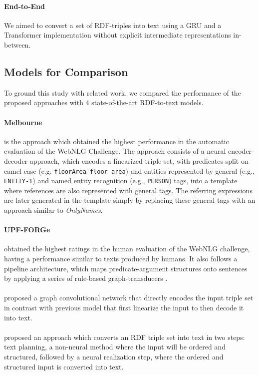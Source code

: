 \documentclass[11pt,a4paper]{article}
\begin{document}
\paragraph{End-to-End} We aimed to convert a set of RDF-triples into text using a GRU and a Transformer implementation without explicit intermediate representations in-between.

\subsection{Models for Comparison}

To ground this study with related work, we compared the performance of the proposed approaches with 4 state-of-the-art RDF-to-text models.

\paragraph{Melbourne} is the approach which obtained the highest performance in the automatic evaluation of the WebNLG Challenge. The approach consists of a neural encoder-decoder approach, which encodes a linearized triple set, with predicates split on camel case (e.g. \texttt{floorArea  floor area}) and entities represented by general (e.g., \texttt{ENTITY-1}) and named entity recognition (e.g., \texttt{PERSON}) tags, into a template where references are also represented with general tags. The referring expressions are later generated in the template simply by replacing these general tags with an approach similar to \textit{OnlyNames}.

\paragraph{UPF-FORGe} obtained the highest ratings in the human evaluation of the WebNLG challenge, having a performance similar to texts produced by humans. It also follows a pipeline architecture, which maps predicate-argument structures onto sentences by applying a series of rule-based graph-transducers \cite{mille2019}.

\paragraph{} proposed a graph convolutional network that directly encodes the input triple set in contrast with previous model that first linearize the input to then decode it into text. 

\paragraph{} proposed an approach which converts an RDF triple set into text in two steps: text planning, a non-neural method where the input will be ordered and structured, followed by a neural realization step, where the ordered and structured input is converted into text. 
\end{document}
